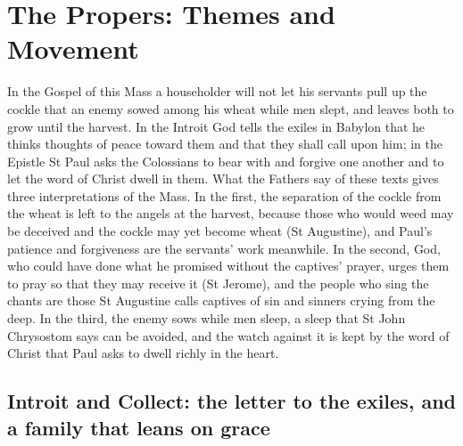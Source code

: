 
\section{The Propers: Themes and Movement}

In the Gospel of this Mass a householder will not let his servants pull up the
cockle that an enemy sowed among his wheat while men slept, and leaves both to
grow until the harvest. In the Introit God tells the exiles in Babylon that he
thinks thoughts of peace toward them and that they shall call upon him; in the
Epistle St Paul asks the Colossians to bear with and forgive one another and
to let the word of Christ dwell in them. What the Fathers say of these texts
gives three interpretations of the Mass. In the first, the separation of the
cockle from the wheat is left to the angels at the harvest, because those who
would weed may be deceived and the cockle may yet become wheat (St Augustine),
and Paul's patience and forgiveness are the servants' work meanwhile. In the
second, God, who could have done what he promised without the captives'
prayer, urges them to pray so that they may receive it (St Jerome), and the
people who sing the chants are those St Augustine calls captives of sin and
sinners crying from the deep. In the third, the enemy sows while men sleep, a
sleep that St John Chrysostom says can be avoided, and the watch against it is
kept by the word of Christ that Paul asks to dwell richly in the heart.

\subsection{Introit and Collect: the letter to the exiles, and a family that leans on grace}

